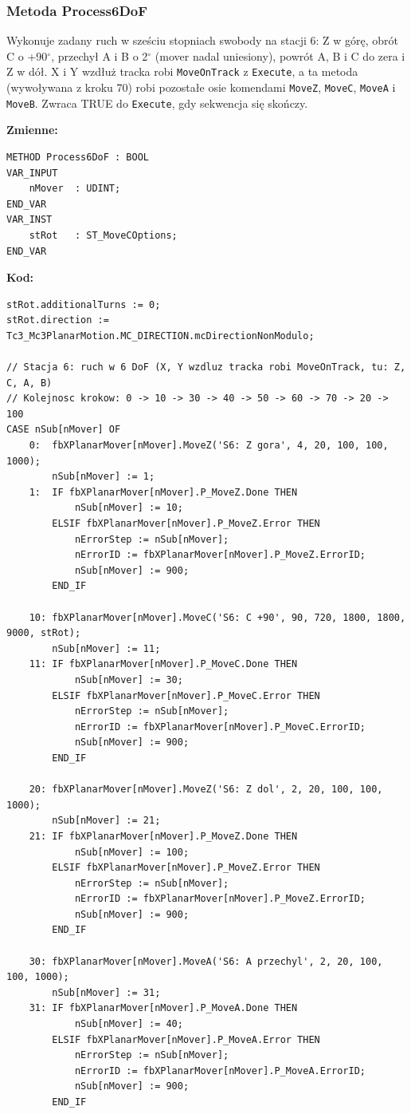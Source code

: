 \documentclass[11pt,a4paper]{report}
\newcommand{\podpodrozdzial}[1]{\subsubsection*{#1}\addcontentsline{toc}{subsubsection}{#1}}
\begin{document}
\podpodrozdzial{Metoda Process6DoF}
Wykonuje zadany ruch w sześciu stopniach swobody na stacji 6: Z w górę, obrót C o +90$^\circ$, przechył A i B o 2$^\circ$ (mover nadal uniesiony), powrót A, B i C do zera i Z w dół. X i Y wzdłuż tracka robi \texttt{MoveOnTrack} z \texttt{Execute}, a ta metoda (wywoływana z kroku 70) robi pozostałe osie komendami \texttt{MoveZ}, \texttt{MoveC}, \texttt{MoveA} i \texttt{MoveB}. Zwraca TRUE do \texttt{Execute}, gdy sekwencja się skończy.

\textbf{Zmienne:}
{\scriptsize
\begin{verbatim}
METHOD Process6DoF : BOOL
VAR_INPUT
    nMover  : UDINT;
END_VAR
VAR_INST
    stRot   : ST_MoveCOptions;
END_VAR
\end{verbatim}}
\textbf{Kod:}
{\scriptsize
\begin{verbatim}
stRot.additionalTurns := 0;
stRot.direction := Tc3_Mc3PlanarMotion.MC_DIRECTION.mcDirectionNonModulo;

// Stacja 6: ruch w 6 DoF (X, Y wzdluz tracka robi MoveOnTrack, tu: Z, C, A, B)
// Kolejnosc krokow: 0 -> 10 -> 30 -> 40 -> 50 -> 60 -> 70 -> 20 -> 100
CASE nSub[nMover] OF
    0:  fbXPlanarMover[nMover].MoveZ('S6: Z gora', 4, 20, 100, 100, 1000);
        nSub[nMover] := 1;
    1:  IF fbXPlanarMover[nMover].P_MoveZ.Done THEN
            nSub[nMover] := 10;
        ELSIF fbXPlanarMover[nMover].P_MoveZ.Error THEN
            nErrorStep := nSub[nMover];
            nErrorID := fbXPlanarMover[nMover].P_MoveZ.ErrorID;
            nSub[nMover] := 900;
        END_IF

    10: fbXPlanarMover[nMover].MoveC('S6: C +90', 90, 720, 1800, 1800, 9000, stRot);
        nSub[nMover] := 11;
    11: IF fbXPlanarMover[nMover].P_MoveC.Done THEN
            nSub[nMover] := 30;
        ELSIF fbXPlanarMover[nMover].P_MoveC.Error THEN
            nErrorStep := nSub[nMover];
            nErrorID := fbXPlanarMover[nMover].P_MoveC.ErrorID;
            nSub[nMover] := 900;
        END_IF

    20: fbXPlanarMover[nMover].MoveZ('S6: Z dol', 2, 20, 100, 100, 1000);
        nSub[nMover] := 21;
    21: IF fbXPlanarMover[nMover].P_MoveZ.Done THEN
            nSub[nMover] := 100;
        ELSIF fbXPlanarMover[nMover].P_MoveZ.Error THEN
            nErrorStep := nSub[nMover];
            nErrorID := fbXPlanarMover[nMover].P_MoveZ.ErrorID;
            nSub[nMover] := 900;
        END_IF

    30: fbXPlanarMover[nMover].MoveA('S6: A przechyl', 2, 20, 100, 100, 1000);
        nSub[nMover] := 31;
    31: IF fbXPlanarMover[nMover].P_MoveA.Done THEN
            nSub[nMover] := 40;
        ELSIF fbXPlanarMover[nMover].P_MoveA.Error THEN
            nErrorStep := nSub[nMover];
            nErrorID := fbXPlanarMover[nMover].P_MoveA.ErrorID;
            nSub[nMover] := 900;
        END_IF


\end{verbatim}}
\end{document}
